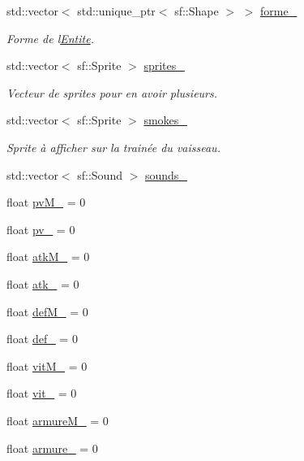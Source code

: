\begin{DoxyCompactItemize}
std\+::vector$<$ std\+::unique\+\_\+ptr$<$ sf\+::\+Shape $>$ $>$ \mbox{\hyperlink{class_entite_aa6bbda9a40f701f273c344406a6f5122}{forme\+\_\+}}
\begin{DoxyCompactList}\small\item\em Forme de l\textquotesingle{}\mbox{\hyperlink{class_entite}{Entite}}. \end{DoxyCompactList}\item 
std\+::vector$<$ sf\+::\+Sprite $>$ \mbox{\hyperlink{class_entite_a0f910cbb084753ee6ff64f102bc3e26c}{sprites\+\_\+}}
\begin{DoxyCompactList}\small\item\em Vecteur de sprites pour en avoir plusieurs. \end{DoxyCompactList}\item 
std\+::vector$<$ sf\+::\+Sprite $>$ \mbox{\hyperlink{class_entite_ad2082af5de01c6c55e74c7dcbfffee0b}{smokes\+\_\+}}
\begin{DoxyCompactList}\small\item\em Sprite à afficher sur la trainée du vaisseau. \end{DoxyCompactList}\item 
std\+::vector$<$ sf\+::\+Sound $>$ \mbox{\hyperlink{class_entite_af5c5fcbcde3d33c2436b1d289cff125e}{sounds\+\_\+}}
\item 
float \mbox{\hyperlink{class_entite_a862ad5eccfc6c925948d41aaf2142718}{pv\+M\+\_\+}} = 0
\item 
float \mbox{\hyperlink{class_entite_a85b09d98caf443622a546345db8828b8}{pv\+\_\+}} = 0
\item 
float \mbox{\hyperlink{class_entite_a23d24cb3993dc5ddd7dff36b9f94b667}{atk\+M\+\_\+}} = 0
\item 
float \mbox{\hyperlink{class_entite_a824f1b9b1058ed92b8883e84bfe89c0e}{atk\+\_\+}} = 0
\item 
float \mbox{\hyperlink{class_entite_af673a89a24b35148e2e53285e3b84bd0}{def\+M\+\_\+}} = 0
\item 
float \mbox{\hyperlink{class_entite_aabc79bd2426d8e68c7ef7da9e95c4542}{def\+\_\+}} = 0
\item 
float \mbox{\hyperlink{class_entite_ac5f9e68aa96316c6871e1980766977a9}{vit\+M\+\_\+}} = 0
\item 
float \mbox{\hyperlink{class_entite_aaacb36948d7853e03a7f9a42aa6ad2d5}{vit\+\_\+}} = 0
\item 
float \mbox{\hyperlink{class_entite_a09d60cae449cda19266d576c18f20c0a}{armure\+M\+\_\+}} = 0
\item 
float \mbox{\hyperlink{class_entite_a014535fad669c3d890a216f9e8049d09}{armure\+\_\+}} = 0

\end{DoxyCompactItemize}
